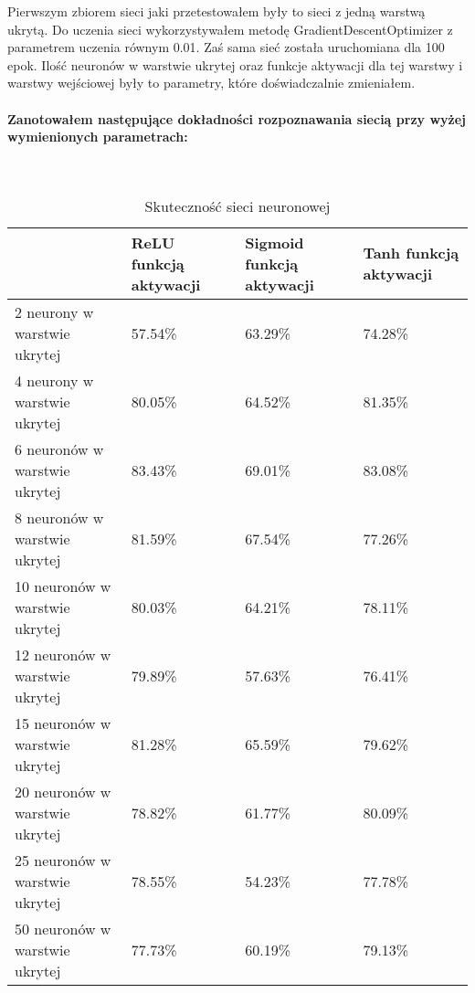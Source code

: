 \documentclass[a4paper,12pt,twoside,openany]{report}
\begin{document}
	Pierwszym zbiorem sieci jaki przetestowałem były to sieci z jedną warstwą ukrytą. Do uczenia sieci wykorzystywałem metodę GradientDescentOptimizer z parametrem uczenia równym 0.01. Zaś sama sieć została uruchomiana dla 100 epok. Ilość neuronów w warstwie ukrytej oraz funkcje aktywacji dla tej warstwy i warstwy wejściowej były to parametry, które doświadczalnie zmieniałem.
	
	\paragraph{Zanotowałem następujące dokładności rozpoznawania siecią przy wyżej wymienionych parametrach:}
	
	\mbox{}\\
	
	\begin{table}[H]
		\centering
		\begin{tabularx}{\textwidth}{|X|X|X|X|}
			\hline
			\textbf{} & \textbf{ReLU funkcją aktywacji} & \textbf{Sigmoid funkcją aktywacji}  & \textbf{Tanh funkcją aktywacji}  \\ 
			
			\hline
			2 neurony w warstwie ukrytej & 57.54\% & 63.29\% & 74.28\% \\ 
			
			\hline
			4 neurony w warstwie ukrytej & 80.05\% & 64.52\% & 81.35\% \\
			
			\hline
			6 neuronów w warstwie ukrytej & 83.43\% & 69.01\% & 83.08\% \\
			
			\hline
			8 neuronów w warstwie ukrytej & 81.59\% & 67.54\% & 77.26\% \\
			
			\hline
			10 neuronów w warstwie ukrytej & 80.03\% & 64.21\% & 78.11\% \\
			
			\hline
			12 neuronów w warstwie ukrytej & 79.89\% & 57.63\% & 76.41\% \\
			
			\hline
			15 neuronów w warstwie ukrytej & 81.28\% & 65.59\% & 79.62\% \\
			
			\hline
			20 neuronów w warstwie ukrytej & 78.82\% & 61.77\% & 80.09\% \\
			
			\hline
			25 neuronów w warstwie ukrytej & 78.55\% & 54.23\% & 77.78\% \\
			
			\hline
			50 neuronów w warstwie ukrytej & 77.73\% & 60.19\% & 79.13\% \\ 
			\hline
		\end{tabularx}
		
		\caption{Skuteczność sieci neuronowej}
	\end{table}
	
\end{document}

